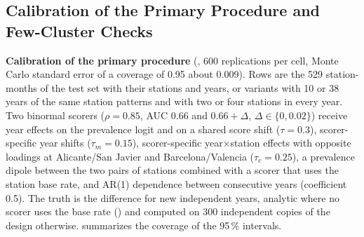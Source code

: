 \documentclass[11pt,a4paper]{article}
\begin{document}
\subsection{Calibration of the Primary Procedure and Few-Cluster Checks}
\label{app:fewclusters}

\textbf{Calibration of the primary procedure} (, 600 replications per cell, Monte Carlo standard error of a coverage of 0.95 about 0.009). Rows are the 529 station-months of the test set with their stations and years, or variants with 10 or 38 years of the same station patterns and with two or four stations in every year. Two binormal scorers ($\rho=0.85$, AUC 0.66 and $0.66+\Delta$, $\Delta\in\{0,0.02\}$) receive year effects on the prevalence logit and on a shared score shift ($\tau=0.3$), scorer-specific year shifts ($\tau_m=0.15$), scorer-specific year$\times$station effects with opposite loadings at Alicante/San Javier and Barcelona/Valencia ($\tau_c=0.25$), a prevalence dipole between the two pairs of stations combined with a scorer that uses the station base rate, and AR(1) dependence between consecutive years (coefficient 0.5). The truth is the difference for new independent years, analytic where no scorer uses the base rate () and computed on 300 independent copies of the design otherwise.  summarizes the coverage of the 95\,\% intervals.

\begin{table}[htbp]
\centering
\caption{Coverage of 95\,\% intervals for the difference for new years (minimum--maximum over the cells of each group; 600 replications per cell). CR2-BM: CR2 with Bell--McCaffrey degrees of freedom (the primary procedure); CR1: $t_{K-1}$; jackknife: delete-one-year, $t_{K-1}$; wild: studentized wild cluster bootstrap, Webb weights; block: percentile year-block bootstrap.}
\label{tab:primary_cal}
{\small
{}}
\end{table}
\end{document}
